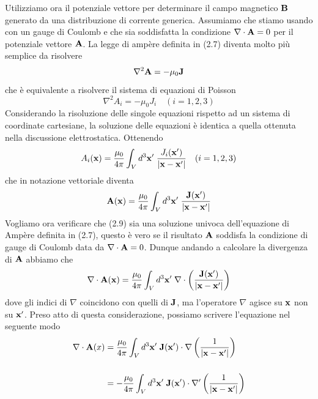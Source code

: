 Utilizziamo ora il potenziale vettore per determinare il campo magnetico $\bold{B}$ generato da una distribuzione di corrente generica. Assumiamo che stiamo usando con un gauge di Coulomb e che sia soddisfatta la condizione $\nabla \cdot \bold{A} =0 $ per il potenziale vettore $\bold{A}$. La legge di amp\`ere definita in (2.7) diventa molto pi\`u semplice da risolvere
\begin{equation}
	\nabla^2 \bold{A} = - \mu_0 \bold{J}
\end{equation}
che \`e equivalente a risolvere il sistema di equazioni di Poisson 
\begin{equation*}
	\nabla^2 A_i = -\mu_0J_i \quad (i=1,2,3)
\end{equation*}
Considerando la risoluzione delle singole equazioni rispetto ad un sistema di coordinate cartesiane, la soluzione delle equazioni \`e identica a quella ottenuta nella discussione elettrostatica. Ottenendo
\begin{equation*}
	A_i(\bold{x}) = \frac{\mu_0}{4 \pi} \int_{V} d^3\bold{x}' \; \frac{J_i(\bold{x}')}{|\bold{x}-\bold{x}'|} \quad (i =1,2,3)
\end{equation*}
che in notazione vettoriale diventa
\begin{equation}
	\bold{A}(\bold{x}) = \frac{\mu_0}{4 \pi} \int_{V} d^3\bold{x}' \; \frac{\bold{J}(\bold{x}')}{|\bold{x} - \bold{x}'|}
\end{equation}
Vogliamo ora verificare che (2.9) sia una soluzione univoca dell'equazione di Amp\`ere definita in (2.7), questo \`e vero se il risultato $\bold{A}$ soddisfa la condizione di gauge di Coulomb data da $\nabla \cdot \bold{A} =0$. Dunque andando a calcolare la divergenza di $\bold{A}$ abbiamo che
\begin{equation*}
	\nabla \cdot \bold{A}(\bold{x}) = \frac{\mu_0}{4\pi} \int_{V} d^3\bold{x}' \; \nabla \cdot \left ( \frac{\bold{J}(\bold{x}')}{|\bold{x}-\bold{x}'|}\right)
\end{equation*}
dove gli indici di $\nabla$ coincidono con quelli di $\bold{J}$, ma l'operatore $\nabla$ agisce su $\bold{x}$ non su $\bold{x}'$. Preso atto di questa considerazione, possiamo scrivere l'equazione nel seguente modo
\newpage 
\begin{align*}
	\nabla \cdot \bold{A}(x) & = \frac{\mu_0}{4 \pi} \int_{V} d^3\bold{x}' \; \bold{J}(\bold{x}') \cdot \nabla \left( \frac{1}{|\bold{x} -\bold{x}'|} \right)\\[0.5cm]
	& = - \frac{\mu_0}{4\pi} \int_V d^3\bold{x}' \; \bold{J}(\bold{x}') \cdot \nabla' \left( \frac{1}{|\bold{x} -\bold{x}'|} \right) 
\end{align*}
